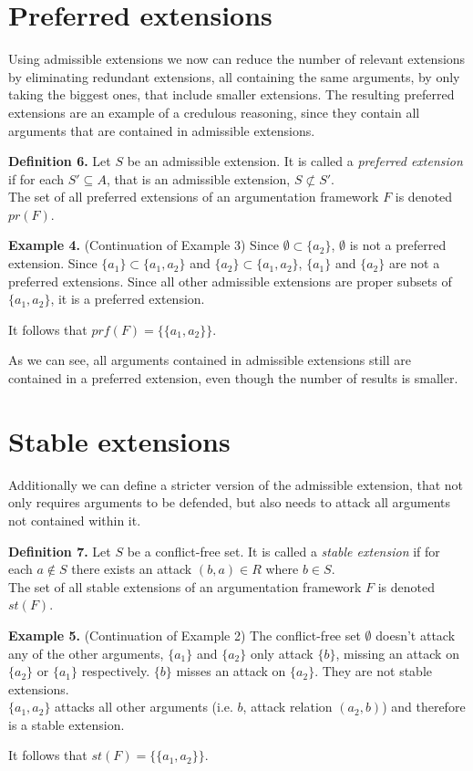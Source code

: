 \documentclass[draft,final]{vutinfth} %
\newcommand{\hl}{\par\vspace{6pt}} %
\newcommand{\cl}{\par\vspace{12pt}} %
\begin{document}
\section{Preferred extensions}

Using admissible extensions we now can reduce the number of relevant extensions by eliminating redundant extensions, all containing the same arguments, by only taking the biggest ones, that include smaller extensions. The resulting preferred extensions are an example of a credulous reasoning, since they contain all arguments that are contained in admissible extensions.\cl

\textbf{Definition 6.} Let $S$ be an admissible extension. It is called a \emph{preferred extension} if for each $S'\subseteq A$, that is an admissible extension, $S\not\subset S'$.\\
The set of all preferred extensions of an argumentation framework $F$ is denoted $pr(F)$.\cl

\textbf{Example 4.} (Continuation of Example 3) Since $\emptyset\subset\{a_2\}$, \(\emptyset\) is not a preferred extension. Since $\{a_1\}\subset\{a_1,a_2\}$ and $\{a_2\}\subset\{a_1,a_2\}$, $\{a_1\}$ and $\{a_2\}$ are not a preferred extensions. Since all other admissible extensions are proper subsets of $\{a_1,a_2\}$, it is a preferred extension.\hl
It follows that $prf(F)=\{\{a_1,a_2\}\}$.\hl
As we can see, all arguments contained in admissible extensions still are contained in a preferred extension, even though the number of results is smaller.\cl

\section{Stable extensions}

Additionally we can define a stricter version of the admissible extension, that not only requires arguments to be defended, but also needs to attack all arguments not contained within it.\cl

\textbf{Definition 7.} Let $S$ be a conflict-free set. It is called a \emph{stable extension} if for each $a\not\in S$ there exists an attack $(b,a)\in R$ where $b\in S$.\\
The set of all stable extensions of an argumentation framework $F$ is denoted $st(F)$.\cl

\textbf{Example 5.} (Continuation of Example 2) The conflict-free set $\emptyset$ doesn't attack any of the other arguments, $\{a_1\}$ and $\{a_2\}$ only attack $\{b\}$, missing an attack on $\{a_2\}$ or $\{a_1\}$ respectively. $\{b\}$ misses an attack on $\{a_2\}$. They are not stable extensions.\\
$\{a_1,a_2\}$ attacks all other arguments (i.e. $b$, attack relation $(a_2,b)$) and therefore is a stable extension.\hl
It follows that $st(F)=\{\{a_1,a_2\}\}$.\cl
\end{document}
